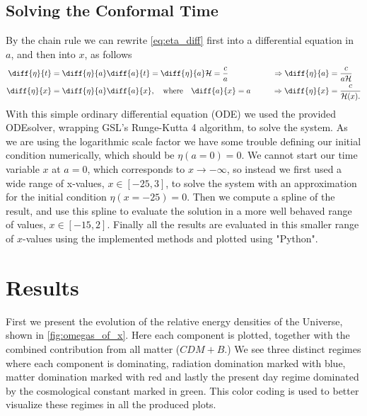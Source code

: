 \documentclass[10pt,a4paper]{article}
\providecommand{\qwhere}
{
    \ensuremath{
    ,\quad \text{where} \quad 
    }
}
\begin{document}
\subsection{Solving the Conformal Time}
\label{subsec:Method/Conformal time}
By the chain rule we can rewrite \cref{eq:eta_diff} first into a differential equation in $a$, and then into $x$, as follows
\begin{alignat}{2}
    \diff{\eta}{t} &= \diff{\eta }{a}\diff{a}{t} = \diff{\eta }{a}\mathcal{H} = \frac{c}{a} & \qquad \Rightarrow \diff{\eta }{a} &= \frac{c}{a\mathcal{H}} \notag
    \\
    \diff{\eta }{x} &= \diff{\eta }{a}\diff{a}{x} \qwhere \diff{a}{x} = a & \qquad \Rightarrow \diff{\eta }{x} &= \frac{c}{\mathcal{H}(x).} \label{eq:eta_diff_of_x}
\end{alignat}
With this simple ordinary differential equation (ODE) we used the provided ODEsolver, wrapping GSL's Runge-Kutta 4 algorithm, to solve the system. As we are using the logarithmic scale factor we have some trouble defining our initial condition numerically, which should be $\eta(a=0)=0$. We cannot start our time variable $x$ at $a=0$, which corresponds to $x\to-\infty$, so instead we first used a wide range of x-values, $x\in[-25,3]$, to solve the system with an approximation for the initial condition $\eta(x=-25)=0$. Then we compute a spline of the result, and use this spline to evaluate the solution in a more well behaved range of values, $x\in[-15,2]$. Finally all the results are evaluated in this smaller range of $x$-values using the implemented methods and plotted using "Python".

\section{Results}
\label{sec:Results}
First we present the evolution of the relative energy densities of the Universe, shown in \cref{fig:omegas_of_x}. Here each component is plotted, together with the combined contribution from all matter ($CDM + B$.) We see three distinct regimes where each component is dominating, radiation domination marked with blue, matter domination marked with red and lastly the present day regime dominated by the cosmological constant marked in green. This color coding is used to better visualize these regimes in all the produced plots.
\end{document}
